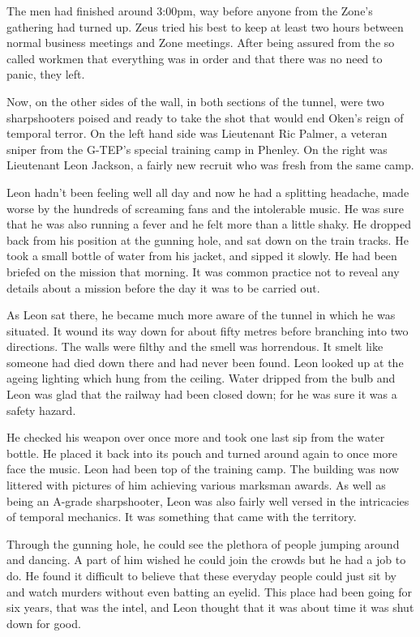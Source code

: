 The men had finished around 3:00pm, way before anyone from the Zone's gathering had turned up.  Zeus tried his best to keep at least two hours between normal business meetings and Zone meetings.  After being assured from the so called workmen that everything was in order and that there was no need to panic, they left.

Now, on the other sides of the wall, in both sections of the tunnel, were two sharpshooters poised and ready to take the shot that would end Oken's reign of temporal terror.  On the left hand side was Lieutenant Ric Palmer, a veteran sniper from the G-TEP's special training camp in Phenley.  On the right was Lieutenant Leon Jackson, a fairly new recruit who was fresh from the same camp.

Leon hadn't been feeling well all day and now he had a splitting headache, made worse by the hundreds of screaming fans and the intolerable music.  He was sure that he was also running a fever and he felt more than a little shaky.  He dropped back from his position at the gunning hole, and sat down on the train tracks.  He took a small bottle of water from his jacket, and sipped it slowly.  He had been briefed on the mission that morning.  It was common practice not to reveal any details about a mission before the day it was to be carried out.  

As Leon sat there, he became much more aware of the tunnel in which he was situated.  It wound its way down for about fifty metres before branching into two directions.  The walls were filthy and the smell was horrendous.  It smelt like someone had died down there and had never been found.  Leon looked up at the ageing lighting which hung from the ceiling.  Water dripped from the bulb and Leon was glad that the railway had been closed down; for he was sure it was a safety hazard.

He checked his weapon over once more and took one last sip from the water bottle.  He placed it back into its pouch and turned around again to once more face the music.  Leon had been top of the training camp.  The building was now littered with pictures of him achieving various marksman awards.  As well as being an A-grade sharpshooter, Leon was also fairly well versed in the intricacies of temporal mechanics.  It was something that came with the territory.

Through the gunning hole, he could see the plethora of people jumping around and dancing.  A part of him wished he could join the crowds but he had a job to do.  He found it difficult to believe that these everyday people could just sit by and watch murders without even batting an eyelid.  This place had been going for six years, that was the intel, and Leon thought that it was about time it was shut down for good.

